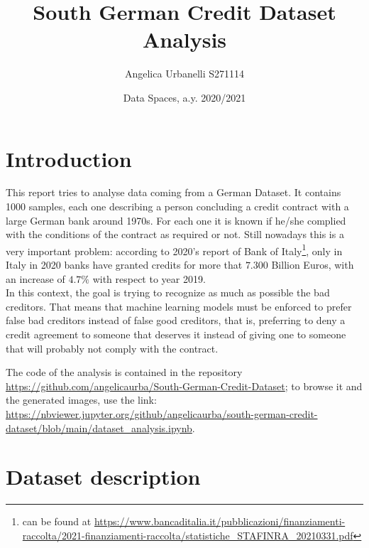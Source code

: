 \documentclass[letterpaper]{article}
\begin{document}
	\title{South German Credit Dataset Analysis}
	\author{Angelica Urbanelli S271114}
	\date{Data Spaces, a.y. 2020/2021}
	\maketitle
	
	\tableofcontents
	
	\newpage 
	\section{Introduction}
	This report tries to analyse data coming from a German Dataset. It contains 1000 samples, each one describing a person concluding a credit contract with a large German bank around 1970s. For each one it is known if he/she complied with the conditions of	the contract as required or not. Still nowadays this is a very important problem: according to 2020's report of Bank of Italy\footnote{can be found at \url{https://www.bancaditalia.it/pubblicazioni/finanziamenti-raccolta/2021-finanziamenti-raccolta/statistiche_STAFINRA_20210331.pdf}}, only in Italy in 2020 banks have granted credits for more that $7.300$ Billion Euros, with an increase of $4.7\%$ with respect to year 2019.\\
	In this context, the goal is trying to recognize as much as possible the bad creditors. That means that machine learning models must be enforced to prefer false bad creditors instead of false good creditors, that is, preferring to deny a credit agreement to someone that deserves it instead of giving one to someone that will probably not comply with the contract.
	\par The code of the analysis is contained in the repository \url{https://github.com/angelicaurba/South-German-Credit-Dataset}; to browse it and the generated images, use the link: \url{https://nbviewer.jupyter.org/github/angelicaurba/south-german-credit-dataset/blob/main/dataset_analysis.ipynb}.	
	\section{Dataset description}
\end{document}
